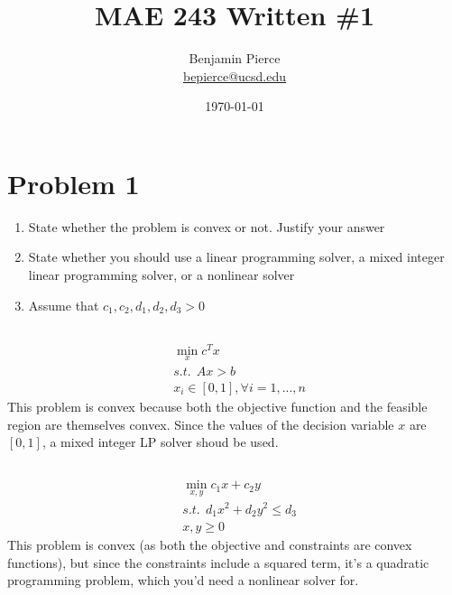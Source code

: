 \documentclass[english]{article}
\date{}
\begin{document}
\title{MAE 243 Written \#1}
\author{Benjamin Pierce \\ \href{mailto:bepierce@ucsd.edu}{bepierce@ucsd.edu}}
\date{\today} 
\maketitle

\section{Problem 1}
\begin{enumerate}
\item State whether the problem is convex or not. Justify your answer
\item State whether you should use a linear programming solver, a mixed integer linear programming
solver, or a nonlinear solver
\item Assume that $c_1, c_2, d_1, d_2, d_3 > 0$
\end{enumerate}
\subsection{}
    \begin{align*}
    & \min_x c^T x \\ 
    & s.t. \ \ Ax > b \\
     & x_i \in [0, 1], \forall i = 1,...,n
    \end{align*}
    This problem is convex because both the objective function and the feasible region are themselves convex. Since the values of the decision variable $x$ are $[0,1]$, a mixed integer LP solver shoud be used.

\subsection{} %
    \begin{align*}
    & \min_{x, y} c_1 x + c_2 y\\ 
    & s.t. \ \ d_1 x^2 + d_2 y^2 \leq d_3 \\
     & x,y \geq 0
    \end{align*} 
    This problem is convex (as both the objective and constraints are convex functions), but since the constraints include a squared term, it's a quadratic programming problem, which you'd need a nonlinear solver for.
    
\end{document}
